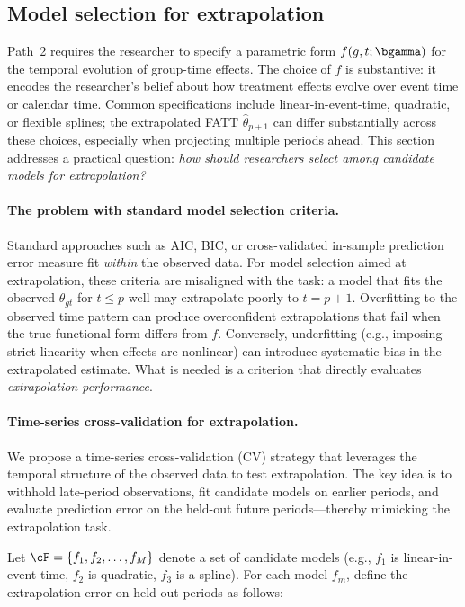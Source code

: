 \documentclass{article}
\begin{document}
\subsection{Model selection for extrapolation}\label{sec:model-selection}

Path~2 requires the researcher to specify a parametric form $f(g,t;\bgamma)$ for the temporal evolution of group-time effects. The choice of $f$ is substantive: it encodes the researcher's belief about how treatment effects evolve over event time or calendar time. Common specifications include linear-in-event-time, quadratic, or flexible splines; the extrapolated FATT $\widehat{\theta}_{p+1}$ can differ substantially across these choices, especially when projecting multiple periods ahead. This section addresses a practical question: \emph{how should researchers select among candidate models for extrapolation?}

\paragraph{The problem with standard model selection criteria.}
Standard approaches such as AIC, BIC, or cross-validated in-sample prediction error measure fit \emph{within} the observed data. For model selection aimed at extrapolation, these criteria are misaligned with the task: a model that fits the observed $\theta_{gt}$ for $t \leq p$ well may extrapolate poorly to $t = p+1$. Overfitting to the observed time pattern can produce overconfident extrapolations that fail when the true functional form differs from $f$. Conversely, underfitting (e.g., imposing strict linearity when effects are nonlinear) can introduce systematic bias in the extrapolated estimate. What is needed is a criterion that directly evaluates \emph{extrapolation performance}.

\paragraph{Time-series cross-validation for extrapolation.}
We propose a time-series cross-validation (CV) strategy that leverages the temporal structure of the observed data to test extrapolation. The key idea is to withhold late-period observations, fit candidate models on earlier periods, and evaluate prediction error on the held-out future periods---thereby mimicking the extrapolation task.

Let $\cF = \{f_1, f_2, \ldots, f_M\}$ denote a set of candidate models (e.g., $f_1$ is linear-in-event-time, $f_2$ is quadratic, $f_3$ is a spline). For each model $f_m$, define the extrapolation error on held-out periods as follows:
\end{document}
